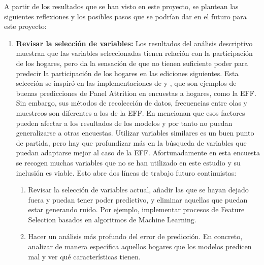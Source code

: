 A partir de los resultados que se han visto en este proyecto, se plantean las siguientes reflexiones y los posibles pasos que se podrían dar en el futuro para este proyecto:

\begin{enumerate}
    \item \textbf{Revisar la selección de variables:} Los resultados del análisis descriptivo muestran que las variables seleccionadas tienen relación con la participación de los hogares, pero da la sensación de que no tienen suficiente poder para predecir la participación de los hogares en las ediciones siguientes. Esta selección se inspiró en las implementaciones de \cite{kern2021predicting} y \cite{beste2023case}, que son ejemplos de buenas predicciones de Panel Attrition en encuestas a hogares, como la EFF. Sin embargo, sus métodos de recolección de datos, frecuencias entre olas y muestreos son diferentes a los de la EFF. En \cite{jankowsky2022validation} mencionan que esos factores pueden afectar a los resultados de los modelos y por tanto no puedan generalizarse a otras encuestas. Utilizar variables similares es un buen punto de partida, pero hay que profundizar más en la búsqueda de variables que puedan adaptarse mejor al caso de la EFF. Afortunadamente en esta encuesta se recogen muchas variables que no se han utilizado en este estudio y su inclusión es viable. Esto abre dos líneas de trabajo futuro continuistas:
    \begin{enumerate}[noitemsep]
        \item Revisar la selección de variables actual, añadir las que se hayan dejado fuera y puedan tener poder predictivo, y eliminar aquellas que puedan estar generando ruido. Por ejemplo, implementar procesos de Feature Selection basados en algoritmos de Machine Learning.
        \item Hacer un análisis más profundo del error de predicción. En concreto, analizar de manera específica aquellos hogares que los modelos predicen mal y ver qué características tienen.
    \end{enumerate}

\end{enumerate}
